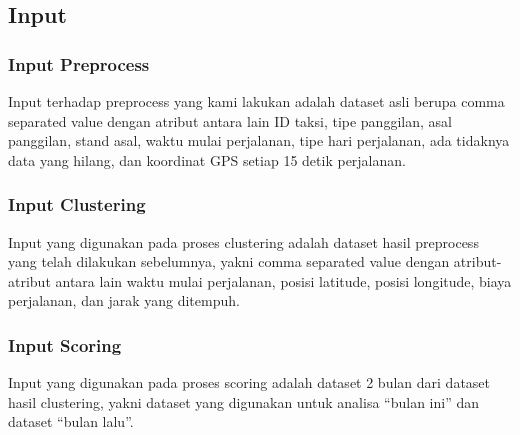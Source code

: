 \documentclass{article}
\begin{document}
\subsection{Input}

\subsubsection{Input Preprocess}

\begin{adjustwidth}{4em}{0pt}
	
	\hspace{\parindent}Input terhadap preprocess yang kami lakukan adalah dataset asli berupa comma separated value dengan atribut antara lain ID taksi, tipe panggilan, asal panggilan, stand asal, waktu mulai perjalanan, tipe hari perjalanan, ada tidaknya data yang hilang, dan koordinat GPS setiap 15 detik perjalanan.
	
\end{adjustwidth}

\subsubsection{Input Clustering}

\begin{adjustwidth}{4em}{0pt}
	
	\hspace{\parindent}Input yang digunakan pada proses clustering adalah dataset hasil preprocess yang telah dilakukan sebelumnya, yakni comma separated value dengan atribut-atribut antara lain waktu mulai perjalanan, posisi latitude, posisi longitude, biaya perjalanan, dan jarak yang ditempuh.
	
	
\end{adjustwidth}

\subsubsection{Input Scoring}

\begin{adjustwidth}{4em}{0pt}
	
	\hspace{\parindent}Input yang digunakan pada proses scoring adalah dataset 2 bulan dari dataset hasil clustering, yakni dataset yang digunakan untuk analisa “bulan ini” dan dataset “bulan lalu”.
	
	
\end{adjustwidth}
\end{document}
